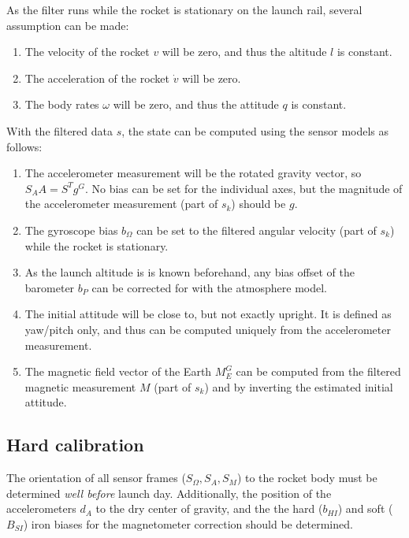 As the filter runs while the rocket is stationary on the launch rail, several assumption can be made:
\begin{enumerate}
    \item The velocity of the rocket $v$ will be zero, and thus the altitude $l$ is constant.
    \item The acceleration of the rocket $\dot v$ will be zero.
    \item The body rates $\omega$ will be zero, and thus the attitude $q$ is constant.
\end{enumerate}
With the filtered data $s$, the state can be computed using the sensor models as follows:
\begin{enumerate}
    \item The accelerometer measurement will be the rotated gravity vector, so $S_A A = S^T g^G$. 
    No bias can be set for the individual axes, but the magnitude of the accelerometer measurement (part of $s_k$) should be $g$.
    
    \item The gyroscope bias $b_\Omega$ can be set to the filtered angular velocity (part of $s_k$) while the rocket is stationary.
    
    \item As the launch altitude is is known beforehand, any bias offset of the barometer $b_P$ can be corrected for with the atmosphere model. 
    
    \item The initial attitude will be close to, but not exactly upright.
    It is defined as yaw/pitch only, and thus can be computed uniquely from the accelerometer measurement.
    
    \item The magnetic field vector of the Earth $M_E^G$ can be computed from the filtered magnetic measurement $M$ (part of $s_k$) and by inverting the estimated initial attitude.
\end{enumerate}

\subsection{Hard calibration}
\label{sec:hard-calibration}
The orientation of all sensor frames ($S_\Omega, S_A, S_M$) to the rocket body must be determined \textit{well before} launch day.
Additionally, the position of the accelerometers $d_A$ to the dry center of gravity, and the the hard ($b_{HI}$) and soft ($B_{SI}$) iron biases for the magnetometer correction should be determined.
